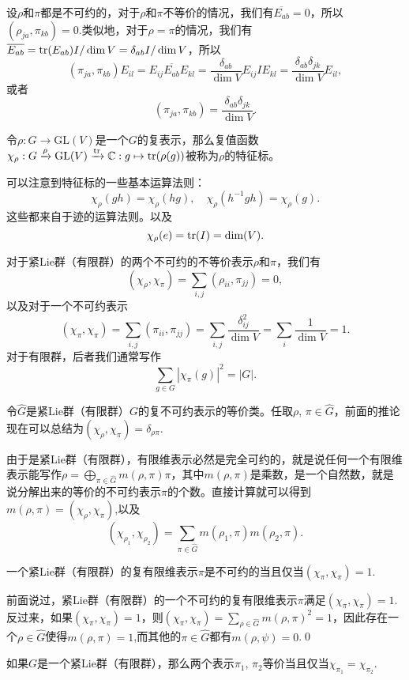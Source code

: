 \documentclass[9pt]{extarticle}
\newcommand{\cc}{\mathbb{C}}
\begin{document}
\para 设$\rho$和$\pi$都是不可约的，对于$\rho$和$\pi$不等价的情况，我们有$\overline{E_{ab}}=0$，所以$\left(\rho_{ja},\pi_{kb}\right)=0$.类似地，对于$\rho=\pi$的情况，我们有$\overline{E_{ab}}=\operatorname{tr}(E_{ab})I/\dim V=\delta_{ab}I/\dim V$，所以
\[
	\left(\pi_{ja},\pi_{kb}\right)E_{il}=E_{ij}\overline{E_{ab}}E_{kl}=\frac{\delta_{ab}}{\dim V}E_{ij}IE_{kl}=\frac{\delta_{ab}\delta_{jk}}{\dim V}E_{il},
\]
或者
\[
	\left(\pi_{ja},\pi_{kb}\right)=\frac{\delta_{ab}\delta_{jk}}{\dim V}.
\]

\para 令$\rho:G\to \mathrm{GL}(V)$是一个$G$的复表示，那么复值函数$\chi_\rho:G\xrightarrow{\rho}\mathrm{GL}(V)\xrightarrow{\tr}\cc:g\mapsto \tr(\rho(g))$被称为$\rho$的特征标。

可以注意到特征标的一些基本运算法则：
\[
	\chi_\rho(gh)=\chi_\rho(hg),\quad \chi_\rho(h^{-1}gh)= \chi_\rho(g).
\]
这些都来自于迹的运算法则。以及
\[
	\chi_\rho(e)=\operatorname{tr}(I)=\dim(V).
\]

\para 对于紧Lie群（有限群）的两个不可约的不等价表示$\rho$和$\pi$，我们有
\[
(\chi_\rho, \chi_\pi)=\sum_{i,j}\left(\rho_{ii},\pi_{jj}\right)=0,
\]
以及对于一个不可约表示
\[
(\chi_\pi, \chi_\pi)=\sum_{i,j}(\pi_{ii},\pi_{jj})=\sum_{i,j}\frac{\delta_{ij}^2}{\dim V}=\sum_{i}\frac{1}{\dim V}=1.
\]
对于有限群，后者我们通常写作
\[
	\sum_{g\in G} |\chi_\pi(g)|^2=|G|.
\]

令$\hat{G}$是紧Lie群（有限群）$G$的复不可约表示的等价类。任取$\rho$, $\pi\in\hat{G}$，前面的推论现在可以总结为$(\chi_\rho,\chi_\pi)=\delta_{\rho\pi}$.

由于是紧Lie群（有限群），有限维表示必然是完全可约的，就是说任何一个有限维表示能写作$\rho=\bigoplus_{\pi\in\hat{G}}m(\rho,\pi)\pi$，其中$m(\rho,\pi)$是乘数，是一个自然数，就是说分解出来的等价的不可约表示$\pi$的个数。直接计算就可以得到$m(\rho,\pi)=(\chi_\rho,\chi_\pi)$,以及
\begin{equation}
	(\chi_{\rho_1},\chi_{\rho_2})=\sum_{\pi\in\hat{G}}m(\rho_1,\pi)m(\rho_2,\pi).
\end{equation}

\pro 一个紧Lie群（有限群）的复有限维表示$\pi$是不可约的当且仅当$(\chi_{\pi},\chi_{\pi})=1$. 

\proof 前面说过，紧Lie群（有限群）的一个不可约的复有限维表示$\pi$满足$(\chi_\pi, \chi_\pi)=1$. 反过来，如果$(\chi_\pi, \chi_\pi)=1$，则$(\chi_{\pi},\chi_{\pi})=\sum_{\rho\in\hat{G}}m(\rho,\pi)^2=1$，因此存在一个$\rho\in\hat{G}$使得$m(\rho,\pi)=1$,而其他的$\pi\in\hat{G}$都有$m(\rho,\psi)=0$.\qed

\pro 如果$G$是一个紧Lie群（有限群），那么两个表示$\pi_1$, $\pi_2$等价当且仅当$\chi_{\pi_1}=\chi_{\pi_2}$.
\end{document}
